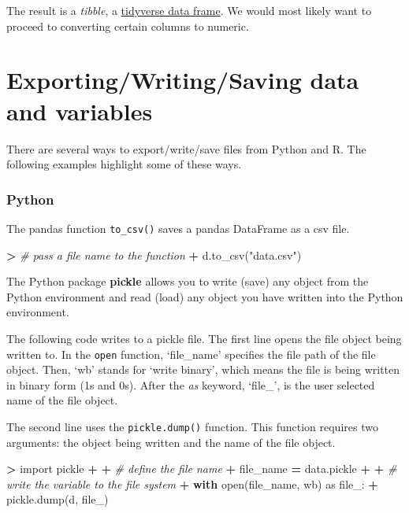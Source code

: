 \documentclass[
]{book}
\newenvironment{Shaded}{\begin{snugshade}}{\end{snugshade}}
\newcommand{\BuiltInTok}[1]{#1}
\newcommand{\CommentTok}[1]{\textcolor[rgb]{0.56,0.35,0.01}{\textit{#1}}}
\newcommand{\ControlFlowTok}[1]{\textcolor[rgb]{0.13,0.29,0.53}{\textbf{#1}}}
\newcommand{\ImportTok}[1]{#1}
\newcommand{\NormalTok}[1]{#1}
\newcommand{\OperatorTok}[1]{\textcolor[rgb]{0.81,0.36,0.00}{\textbf{#1}}}
\newcommand{\StringTok}[1]{\textcolor[rgb]{0.31,0.60,0.02}{#1}}
\begin{document}
The result is a \emph{tibble}, a \href{https://tibble.tidyverse.org/}{tidyverse data frame}. We would most likely want to proceed to converting certain columns to numeric.

\hypertarget{exportingwritingsaving-data-and-variables}{%
\section{Exporting/Writing/Saving data and variables}\label{exportingwritingsaving-data-and-variables}}

There are several ways to export/write/save files from Python and R. The following examples highlight some of these ways.

\hypertarget{python-16}{%
\subsubsection*{Python}\label{python-16}}

The pandas function \texttt{to\_csv()} saves a pandas DataFrame as a csv file.

\begin{Shaded}
\begin{Highlighting}[]
\OperatorTok{\textgreater{}} \CommentTok{\# pass a file name to the function}
\OperatorTok{+}\NormalTok{ d.to\_csv(}\StringTok{"data.csv"}\NormalTok{)}
\end{Highlighting}
\end{Shaded}

The Python package \textbf{pickle} allows you to write (save) any object from the Python environment and read (load) any object you have written into the Python environment.

The following code writes to a pickle file. The first line opens the file object being written to. In the \texttt{open} function, `file\_name' specifies the file path of the file object. Then, `wb' stands for `write binary', which means the file is being written in binary form (1s and 0s). After the \emph{as} keyword, `file\_', is the user selected name of the file object.

The second line uses the \texttt{pickle.dump()} function. This function requires two arguments: the object being written and the name of the file object.

\begin{Shaded}
\begin{Highlighting}[]
\OperatorTok{\textgreater{}} \ImportTok{import}\NormalTok{ pickle}
\OperatorTok{+} 
\OperatorTok{+} \CommentTok{\# define the file name}
\OperatorTok{+}\NormalTok{ file\_name }\OperatorTok{=} \StringTok{\textquotesingle{}data.pickle\textquotesingle{}}
\OperatorTok{+} 
\OperatorTok{+} \CommentTok{\# write the variable to the file system}
\OperatorTok{+} \ControlFlowTok{with} \BuiltInTok{open}\NormalTok{(file\_name, }\StringTok{\textquotesingle{}wb\textquotesingle{}}\NormalTok{) }\ImportTok{as}\NormalTok{ file\_:}
\OperatorTok{+}\NormalTok{     pickle.dump(d, file\_)}
\end{Highlighting}
\end{Shaded}
\end{document}
